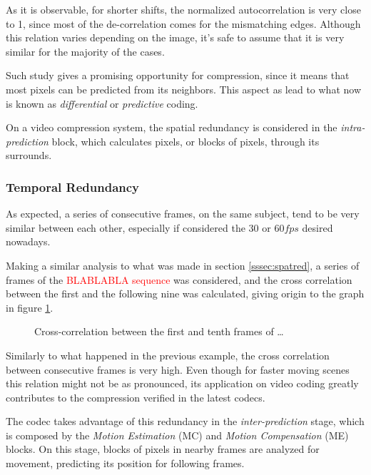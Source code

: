 As it is observable, for shorter shifts, the normalized autocorrelation is very close to 1, since most of the de-correlation comes for the mismatching edges. Although this relation varies depending on the image, it's safe to assume that it is very similar for the majority of the cases.

Such study gives a promising opportunity for compression, since it means that most pixels can be predicted from its neighbors. This aspect as lead to what now is known as \emph{differential} or \emph{predictive} coding.

On a video compression system, the spatial redundancy is considered in the \emph{intra-prediction} block, which calculates pixels, or blocks of pixels, through its surrounds.

\subsubsection{Temporal Redundancy}

As expected, a series of consecutive frames, on the same subject, tend to be very similar between each other, especially if considered the $30$ or $60 fps$ desired nowadays. 

Making a similar analysis to what was made in section \ref{sssec:spatred}, a series of frames of the \textcolor{red}{BLABLABLA sequence} was considered, and the cross correlation between the first and the following nine was calculated, giving origin to the graph in figure \ref{fig:crosscorr}.

\begin{figure}[h]
    \centering
    \caption{Cross-correlation between the first and tenth frames of \dots}
    \label{fig:crosscorr}
\end{figure}

Similarly to what happened in the previous example, the cross correlation between consecutive frames is very high. Even though for faster moving scenes this relation might not be as pronounced, its application on video coding greatly contributes to the compression verified in the latest codecs. 

The codec takes advantage of this redundancy in the \emph{inter-prediction} stage, which is composed by the \emph{Motion Estimation} (MC) and \emph{Motion Compensation} (ME) blocks. On this stage, blocks of pixels in nearby frames are analyzed for movement, predicting its position for following frames.

